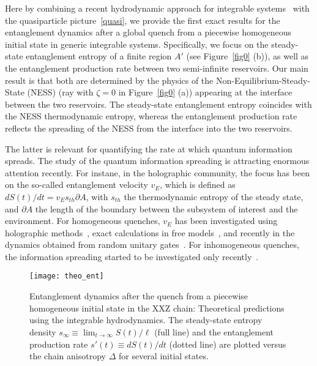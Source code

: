 \documentclass[twocolumn,superscriptaddress,prb,10pt]{revtex4-1}
\begin{document}
Here by combining a recent hydrodynamic approach for integrable 
systems~\cite{olalla-2016,bertini-2016} with the quasiparticle picture~\eqref{quasi}, 
we provide the first exact results for the entanglement dynamics after a global 
quench from a piecewise homogeneous initial state in generic integrable 
systems. Specifically, we focus on the steady-state 
entanglement entropy of a finite region $A'$ (see Figure~\ref{fig0} (b)), as well as 
the entanglement production rate between two semi-infinite reservoirs. Our main result is that both 
are determined by the physics of the Non-Equilibrium-Steady-State (NESS) 
(ray with $\zeta=0$ in Figure~\ref{fig0} (a)) appearing at the interface between 
the two reservoirs. The steady-state 
entanglement entropy coincides with the NESS thermodynamic entropy, whereas 
the entanglement production rate reflects the spreading of the NESS from the 
interface into the two reservoirs. 
 
The latter is relevant for quantifying the rate at which quantum information 
spreads. The study of the quantum information spreading is attracting enormous 
attention recently. For instane, in the holographic community, the 
focus has been on the so-called entanglement velocity $v_E$, 
which is defined as~\cite{hol-vel} $dS(t)/dt=v_E s_{th}\partial A$, with $s_{th}$ the thermodynamic 
entropy of the steady state, and $\partial A$ the length of the boundary between 
the subsystem of interest and the environment. For homogeneous quenches, $v_E$ 
has been investigated using holographic methods~\cite{hol-vel}, exact calculations 
in free models~\cite{cotler-2016,ff-vel}, and recently in the dynamics obtained 
from random unitary gates~\cite{ru-vel}. For inhomogeneous quenches, the 
information spreading started to be investigated only recently~\cite{erdmenger-2017}. 


\begin{figure}[t]
\texttt{[image: theo\_ent]}
\caption{ Entanglement dynamics after the quench from a piecewise homogeneous 
 initial state in the XXZ 
 chain: Theoretical predictions using the integrable hydrodynamics. 
 The steady-state entropy density $s_\infty\equiv\lim_{t\to\infty}S(t)/\ell$ 
 (full line) and the entanglement production rate $s'(t)\equiv dS(t)/dt$ 
 (dotted line) are plotted versus the chain anisotropy $\Delta$ for 
 several initial states. 
}
\label{fig1}
\end{figure}
%
\end{document}
